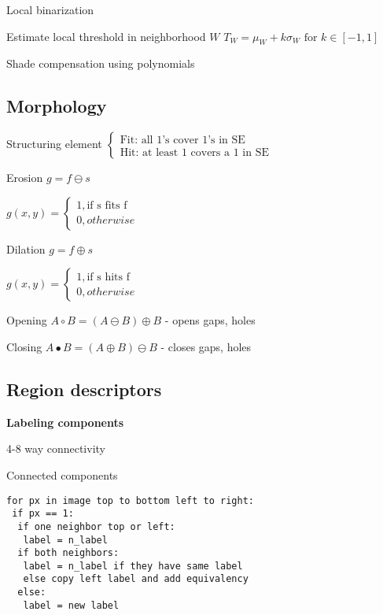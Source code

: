 \documentclass{article}
\begin{document}
\begin{multicols*}{2}
{\begin{compactitem}
		\item Local binarization

		Estimate local threshold in neighborhood $W$
		$T_W = \mu_W + k\sigma_W \text{ for } k \in [-1,1]$

		\item Shade compensation using polynomials
	\end{compactitem}

	\subsection{Morphology}

	Structuring element
	$\begin{cases}
			\text{Fit: all 1's cover 1's in SE} \\
			\text{Hit: at least 1 covers a 1 in SE}
		\end{cases}$

	\begin{compactitem}
		\item Erosion $g = f \ominus s$

		$g(x,y) = \begin{cases}
				1, \text{if s fits f} \\
				0, otherwise
			\end{cases}$

		\item Dilation $g = f \oplus s$

		$g(x,y) = \begin{cases}
				1, \text{if s hits f} \\
				0, otherwise
			\end{cases}$

		\item Opening $A \circ B = (A \ominus B) \oplus B$
		- opens gaps, holes

		\item Closing $A \bullet B = (A \oplus B) \ominus B$
		- closes gaps, holes
	\end{compactitem}

	\subsection{Region descriptors}

	\textbf{Labeling components}

	\begin{compactitem}
		\item 4-8 way connectivity
		\item Connected components
		\begin{lstlisting}
for px in image top to bottom left to right:
 if px == 1:
  if one neighbor top or left:
   label = n_label
  if both neighbors:
   label = n_label if they have same label
   else copy left label and add equivalency
  else:
   label = new label
	\end{lstlisting}


\end{compactitem}}
\end{multicols*}
\end{document}
